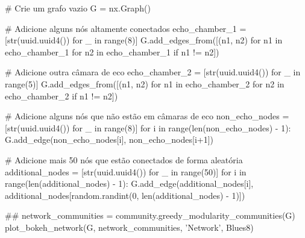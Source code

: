 \begin{codigo}[caption={Exemplo de script Python para criar um Grafo aleatório de uma rede social contendo pelo menos uma câmara de eco}, label={codigo:growing_random_models}, language=Python, breaklines=true]
# Crie um grafo vazio
G = nx.Graph()

# Adicione alguns nós altamente conectados
echo_chamber_1 = [str(uuid.uuid4()) for _ in range(8)]
G.add_edges_from([(n1, n2) for n1 in echo_chamber_1 for n2 in echo_chamber_1 if n1 != n2])

# Adicione outra câmara de eco
echo_chamber_2 = [str(uuid.uuid4()) for _ in range(5)]
G.add_edges_from([(n1, n2) for n1 in echo_chamber_2 for n2 in echo_chamber_2 if n1 != n2])

# Adicione alguns nós que não estão em câmaras de eco
non_echo_nodes = [str(uuid.uuid4()) for _ in range(8)]
for i in range(len(non_echo_nodes) - 1):
    G.add_edge(non_echo_nodes[i], non_echo_nodes[i+1])

# Adicione mais 50 nós que estão conectados de forma aleatória
additional_nodes = [str(uuid.uuid4()) for _ in range(50)]
for i in range(len(additional_nodes) - 1):
    G.add_edge(additional_nodes[i], additional_nodes[random.randint(0, len(additional_nodes) - 1)])

##
network_communities = community.greedy_modularity_communities(G)
plot_bokeh_network(G, network_communities, 'Network', Blues8)
\end{codigo}